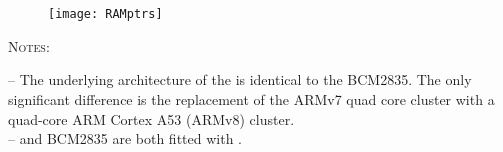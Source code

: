 
\chapter{\bcm{} \ram{}} %

\label{AppendixB} %

\begin{figure}[!htbp]
\centering
\texttt{[image: RAMptrs]}
\end{figure}

\textsc{Notes}:

-- The underlying architecture of the \bcm{} is identical to the BCM2835. The only significant difference is the replacement of the ARMv7 quad core cluster with a quad-core ARM Cortex A53 (ARMv8) cluster.\\

-- \bcm{} and BCM2835 are both fitted with \vc.

